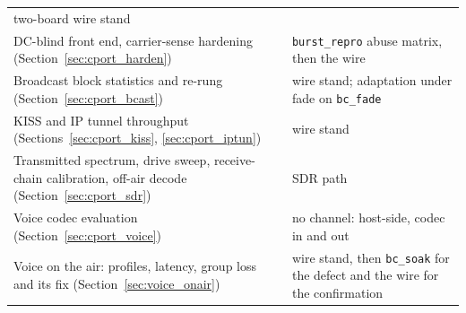 \begin{table}[H]
\begin{tabular}{@{}p{7.4cm}p{6.6cm}@{}}
        two-board wire stand \\
    DC-blind front end, carrier-sense hardening
        (Section~\ref{sec:cport_harden}) &
        \texttt{burst\_repro} abuse matrix, then the wire \\
    Broadcast block statistics and re-rung
        (Section~\ref{sec:cport_bcast}) & wire stand; adaptation under
        fade on \texttt{bc\_fade} \\
    KISS and IP tunnel throughput (Sections~\ref{sec:cport_kiss},
        \ref{sec:cport_iptun}) & wire stand \\
    Transmitted spectrum, drive sweep, receive-chain calibration,
        off-air decode (Section~\ref{sec:cport_sdr}) & SDR path \\
    Voice codec evaluation (Section~\ref{sec:cport_voice}) &
        no channel: host-side, codec in and out \\
    Voice on the air: profiles, latency, group loss and its fix
        (Section~\ref{sec:voice_onair}) & wire stand, then
        \texttt{bc\_soak} for the defect and the wire for the
        confirmation \\
    \bottomrule
    \end{tabular}
\end{table}
